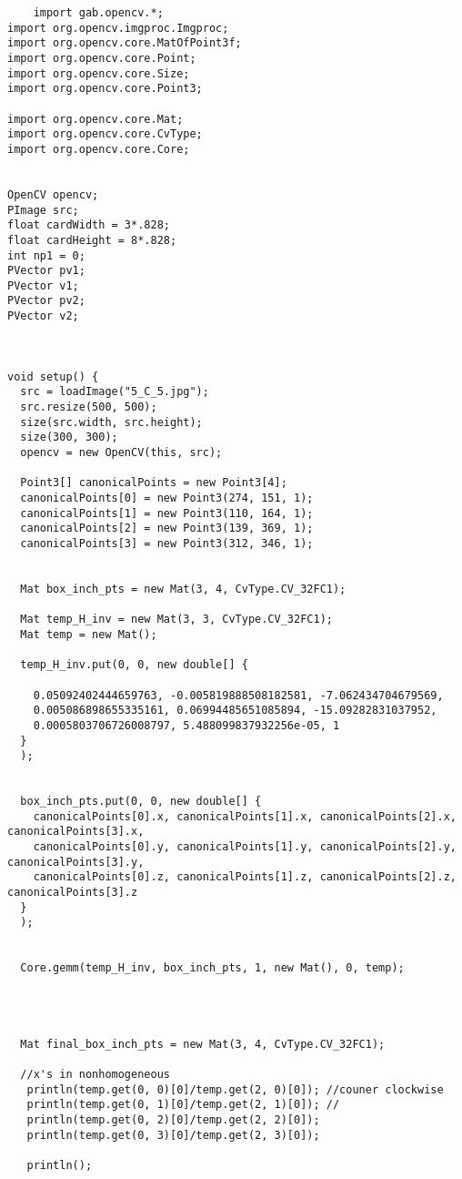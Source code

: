\documentclass[11pt, twoside, reqno]{book}
\begin{document}
\begin{Verbatim}
	import gab.opencv.*;
import org.opencv.imgproc.Imgproc;
import org.opencv.core.MatOfPoint3f;
import org.opencv.core.Point;
import org.opencv.core.Size;
import org.opencv.core.Point3;

import org.opencv.core.Mat;
import org.opencv.core.CvType;
import org.opencv.core.Core;


OpenCV opencv;
PImage src;
float cardWidth = 3*.828;
float cardHeight = 8*.828;
int np1 = 0;
PVector pv1;
PVector v1;
PVector pv2;
PVector v2;



void setup() {
  src = loadImage("5_C_5.jpg");
  src.resize(500, 500);
  size(src.width, src.height);
  size(300, 300);
  opencv = new OpenCV(this, src);

  Point3[] canonicalPoints = new Point3[4]; 
  canonicalPoints[0] = new Point3(274, 151, 1); 
  canonicalPoints[1] = new Point3(110, 164, 1);
  canonicalPoints[2] = new Point3(139, 369, 1);
  canonicalPoints[3] = new Point3(312, 346, 1);


  Mat box_inch_pts = new Mat(3, 4, CvType.CV_32FC1); 

  Mat temp_H_inv = new Mat(3, 3, CvType.CV_32FC1); 
  Mat temp = new Mat(); 

  temp_H_inv.put(0, 0, new double[] { 

    0.05092402444659763, -0.005819888508182581, -7.062434704679569, 
    0.005086898655335161, 0.06994485651085894, -15.09282831037952, 
    0.0005803706726008797, 5.488099837932256e-05, 1
  }
  ); 
  

  box_inch_pts.put(0, 0, new double[] { 
    canonicalPoints[0].x, canonicalPoints[1].x, canonicalPoints[2].x, canonicalPoints[3].x, 
    canonicalPoints[0].y, canonicalPoints[1].y, canonicalPoints[2].y, canonicalPoints[3].y, 
    canonicalPoints[0].z, canonicalPoints[1].z, canonicalPoints[2].z, canonicalPoints[3].z
  }
  );

  
  Core.gemm(temp_H_inv, box_inch_pts, 1, new Mat(), 0, temp);


 

  Mat final_box_inch_pts = new Mat(3, 4, CvType.CV_32FC1); 
  
  //x's in nonhomogeneous
   println(temp.get(0, 0)[0]/temp.get(2, 0)[0]); //couner clockwise 
   println(temp.get(0, 1)[0]/temp.get(2, 1)[0]); //
   println(temp.get(0, 2)[0]/temp.get(2, 2)[0]);
   println(temp.get(0, 3)[0]/temp.get(2, 3)[0]);
   
   println();
   

\end{Verbatim}
\end{document}
